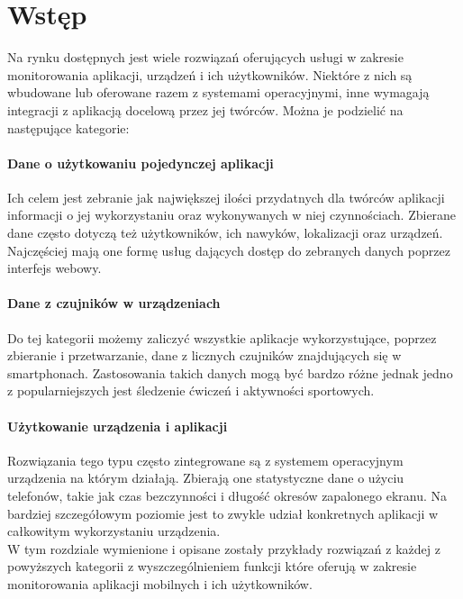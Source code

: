 \section{Wstęp}
Na rynku dostępnych jest wiele rozwiązań oferujących usługi w zakresie monitorowania aplikacji, urządzeń i ich użytkowników. Niektóre z nich są wbudowane lub oferowane razem z systemami operacyjnymi, inne wymagają integracji z aplikacją docelową przez jej twórców. Można je podzielić na następujące kategorie:

\paragraph{Dane o użytkowaniu pojedynczej aplikacji} 
Ich celem jest zebranie jak największej ilości przydatnych dla twórców aplikacji informacji o jej wykorzystaniu oraz wykonywanych w niej czynnościach. Zbierane dane często dotyczą też użytkowników, ich nawyków, lokalizacji oraz urządzeń. Najczęściej mają one formę usług dających dostęp do zebranych danych poprzez interfejs webowy. 

\paragraph{Dane z czujników w urządzeniach} 
Do tej kategorii możemy zaliczyć wszystkie aplikacje wykorzystujące, poprzez zbieranie i przetwarzanie, dane z licznych czujników znajdujących się w smartphonach. Zastosowania takich danych mogą być bardzo różne jednak jedno z popularniejszych jest śledzenie ćwiczeń i aktywności sportowych.

\paragraph{Użytkowanie urządzenia i aplikacji} 
Rozwiązania tego typu często zintegrowane są z systemem operacyjnym urządzenia na którym działają. Zbierają one statystyczne dane o użyciu telefonów, takie jak czas bezczynności i długość okresów zapalonego ekranu. Na bardziej szczegółowym poziomie jest to zwykle udział konkretnych aplikacji w całkowitym wykorzystaniu urządzenia.
\\

W tym rozdziale wymienione i opisane zostały przykłady rozwiązań z każdej z powyższych kategorii z wyszczególnieniem funkcji które oferują w zakresie monitorowania aplikacji mobilnych i ich użytkowników.
